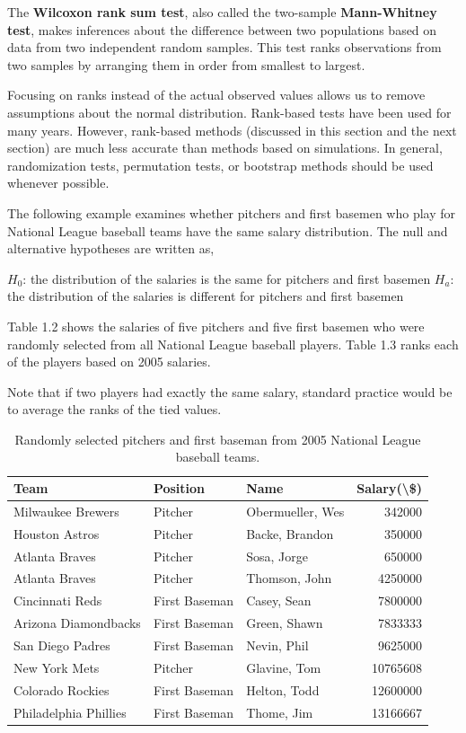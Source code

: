 \documentclass[
]{report}
\begin{document}
The \textbf{Wilcoxon rank sum test}, also called the two-sample \textbf{Mann-Whitney test}, makes inferences about the difference between two populations based on data from two independent random samples. This test ranks observations from two samples by arranging them in order from smallest to largest.

Focusing on ranks instead of the actual observed values allows us to remove assumptions about the normal distribution. Rank-based tests have been used for many years. However, rank-based methods (discussed in this section and the next section) are much less accurate than methods based on simulations. In general, randomization tests, permutation tests, or bootstrap methods should be used whenever possible.

The following example examines whether pitchers and first basemen who play for National League baseball teams have the same salary distribution. The null and alternative hypotheses are written as,

\(H_0\): the distribution of the salaries is the same for pitchers and first basemen
\(H_a\): the distribution of the salaries is different for pitchers and first basemen

Table 1.2 shows the salaries of five pitchers and five first basemen who were randomly selected from all National League baseball players. Table 1.3 ranks each of the players based on 2005 salaries.

Note that if two players had exactly the same salary, standard practice would be to average the ranks of the tied values.

\begin{table}

\caption{\label{tab:table2}Randomly selected pitchers and first baseman from 2005 National League baseball teams.}
\centering
\begin{tabular}[t]{lllr}
\toprule
Team & Position & Name & Salary(\textbackslash{}\$)\\
\midrule
Milwaukee Brewers & Pitcher & Obermueller, Wes & 342000\\
Houston Astros & Pitcher & Backe, Brandon & 350000\\
Atlanta Braves & Pitcher & Sosa, Jorge & 650000\\
Atlanta Braves & Pitcher & Thomson, John & 4250000\\
Cincinnati Reds & First Baseman & Casey, Sean & 7800000\\
\addlinespace
Arizona Diamondbacks & First Baseman & Green, Shawn & 7833333\\
San Diego Padres & First Baseman & Nevin, Phil & 9625000\\
New York Mets & Pitcher & Glavine, Tom & 10765608\\
Colorado Rockies & First Baseman & Helton, Todd & 12600000\\
Philadelphia Phillies & First Baseman & Thome, Jim & 13166667\\
\bottomrule
\end{tabular}
\end{table}
\end{document}
